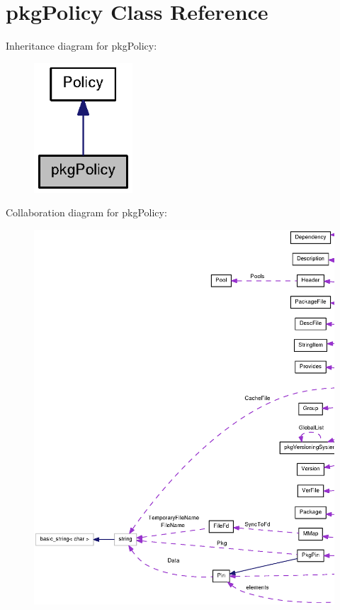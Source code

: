 \section{pkg\-Policy \-Class \-Reference}
\label{classpkgPolicy}


\-Inheritance diagram for pkg\-Policy\-:
\nopagebreak
\begin{figure}[H]
\begin{center}
\leavevmode
\includegraphics[width=104pt]{classpkgPolicy__inherit__graph}
\end{center}
\end{figure}


\-Collaboration diagram for pkg\-Policy\-:
\nopagebreak
\begin{figure}[H]
\begin{center}
\leavevmode
\includegraphics[width=350pt]{classpkgPolicy__coll__graph}
\end{center}
\end{figure}
